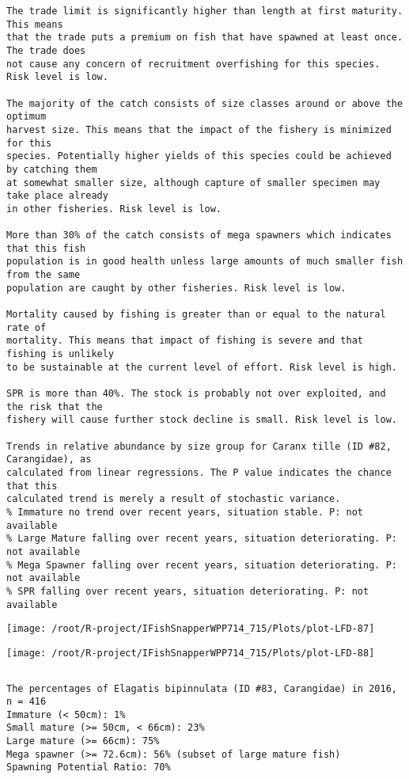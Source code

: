 \documentclass{report}\usepackage[]{graphicx}\usepackage[]{color}
\makeatletter
\def\maxwidth{ %
  \ifdim\Gin@nat@width>\linewidth
    \linewidth
  \else
    \Gin@nat@width
  \fi
}
\newenvironment{kframe}{%
 \def\at@end@of@kframe{}%
 \ifinner\ifhmode%
  \def\at@end@of@kframe{\end{minipage}}%
  \begin{minipage}{\columnwidth}%
 \fi\fi%
 \def\FrameCommand##1{\hskip\@totalleftmargin \hskip-\fboxsep
 \colorbox{shadecolor}{##1}\hskip-\fboxsep
     \hskip-\linewidth \hskip-\@totalleftmargin \hskip\columnwidth}%
 \MakeFramed {\advance\hsize-\width
   \@totalleftmargin\z@ \linewidth\hsize
   \@setminipage}}%
 {\par\unskip\endMakeFramed%
 \at@end@of@kframe}
\newenvironment{knitrout}{}{} %
\makeatother
\begin{document}
\begin{knitrout}
\begin{kframe}
\begin{verbatim}
The trade limit is significantly higher than length at first maturity.  This means
that the trade puts a premium on fish that have spawned at least once. The trade does
not cause any concern of recruitment overfishing for this species. Risk level is low.

The majority of the catch consists of size classes around or above the optimum
harvest size. This means that the impact of the fishery is minimized for this
species. Potentially higher yields of this species could be achieved by catching them
at somewhat smaller size, although capture of smaller specimen may take place already
in other fisheries. Risk level is low.

More than 30% of the catch consists of mega spawners which indicates that this fish
population is in good health unless large amounts of much smaller fish from the same
population are caught by other fisheries. Risk level is low.
 
Mortality caused by fishing is greater than or equal to the natural rate of
mortality. This means that impact of fishing is severe and that fishing is unlikely
to be sustainable at the current level of effort. Risk level is high.
 
SPR is more than 40%. The stock is probably not over exploited, and the risk that the
fishery will cause further stock decline is small. Risk level is low.
 
Trends in relative abundance by size group for Caranx tille (ID #82, Carangidae), as
calculated from linear regressions. The P value indicates the chance that this
calculated trend is merely a result of stochastic variance.
% Immature no trend over recent years, situation stable. P: not available
% Large Mature falling over recent years, situation deteriorating. P: not available
% Mega Spawner falling over recent years, situation deteriorating. P: not available
% SPR falling over recent years, situation deteriorating. P: not available
\end{verbatim}
\end{kframe}
\texttt{[image: /root/R-project/IFishSnapperWPP714\_715/Plots/plot-LFD-87]} 

\texttt{[image: /root/R-project/IFishSnapperWPP714\_715/Plots/plot-LFD-88]} 
\begin{kframe}\begin{verbatim}
\end{verbatim}
\end{kframe}
\clearpage
\newpage
\begin{kframe}\begin{verbatim}The percentages of Elagatis bipinnulata (ID #83, Carangidae) in 2016, n = 416
Immature (< 50cm): 1%
Small mature (>= 50cm, < 66cm): 23%
Large mature (>= 66cm): 75%
Mega spawner (>= 72.6cm): 56% (subset of large mature fish)
Spawning Potential Ratio: 70%
 

\end{verbatim}
\end{kframe}
\end{knitrout}
\end{document}
